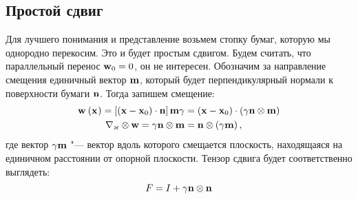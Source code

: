\documentclass[a4papper, 14pt]{book}
\renewcommand{\kappa}{\ensuremath{\varkappa}}
\newcommand{\diad}{\ensuremath\otimes}
\newcommand{\wx}[3]{\ensuremath\mf{w}_{#3}\left({\mathbf{#1}}_{#2} \right)}
\newcommand{\lf}{\ensuremath \left(}
\newcommand{\ri}{\ensuremath \right)}
\newcommand{\mf}[1]{\ensuremath\mathbf{#1}}
\theoremstyle{plain} %
\theoremstyle{definition} %
\theoremstyle{remark} %
\begin{document}
	\subsection{Простой сдвиг}
	Для лучшего понимания и представление возьмем стопку бумаг, которую мы однородно перекосим. Это и будет простым сдвигом. Будем считать, что параллельный перенос $\mf{w}_0 = 0$, он не интересен. Обозначим за направление смещения единичный вектор $\mf{m}$, который будет перпендикулярный нормали к поверхности бумаги $\mf{n}$. Тогда запишем смещение:
	\begin{align}
	\wx{x}{}{} = \left[ \lf\mf{x} - \mf{x}_0\ri\cdot\mf{n}\right] \mf{m}\gamma &= \lf \mf{x} - \mf{x}_0\ri\cdot\lf\gamma\mf{n}\diad \mf{m}\ri \\
	\nabla_{\kappa}\diad\mf{w} = \gamma\mf{n}\diad\mf{m} &= \mf{n}\diad\lf\gamma\mf{m}\ri,
	\end{align}
	где вектор $\gamma\mf{m}$ "--- вектор вдоль которого смещается плоскость, находящаяся на единичном расстоянии от опорной плоскости. Тензор сдвига будет соответственно выглядеть:
	\begin{equation}\label{eq:sdvig}
	F = I + \gamma\mf{n}\diad\mf{n}
	\end{equation}
\end{document}
